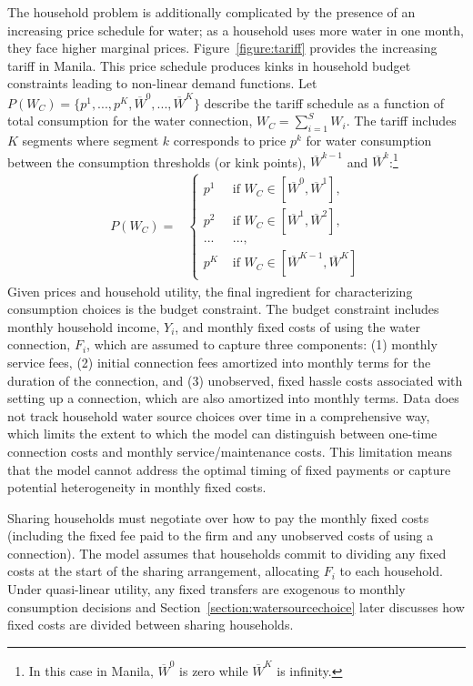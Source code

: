\documentclass[12pt]{article}
\begin{document}
The household problem is additionally complicated by the presence of an increasing price schedule for water; as a household uses more water in one month, they face higher marginal prices.  Figure~\ref{figure:tariff} provides the increasing tariff in Manila.  This price schedule produces kinks in household budget constraints leading to non-linear demand functions.  Let $P(W_C) = \{ p^{1},...,p^{K},\overline{W}^{0},...,\overline{W}^{K}\}$ describe the tariff schedule as a function of total consumption for the water connection, $W_C = \sum_{i=1}^{S} W_i$.  The tariff includes $K$ segments where segment $k$ corresponds to price $p^{k}$ for water consumption between the consumption thresholds (or kink points), $\overline{W}^{k-1}$ and $\overline{W}^{k}$:\footnote{In this case in Manila, $\overline{W}^{0}$ is zero while $\overline{W}^{K}$ is infinity.}
\begin{align*}
P(W_C)=&  
\begin{cases}
      p^{1} &\text{ if } W_C \in [\overline{W}^{0},\overline{W}^{1}], \\
      p^{2} &\text{ if } W_C \in [\overline{W}^{1},\overline{W}^{2}], \\
      ...   &\text{ ...}, \\
      p^{K} &\text{ if } W_C \in[\overline{W}^{K-1},\overline{W}^{K}]
    \end{cases}
\end{align*}
Given prices and household utility, the final ingredient for characterizing consumption choices is the budget constraint.  The budget constraint includes monthly household income, $Y_i$, and monthly fixed costs of using the water connection, $F_i$, which are assumed to capture three components: (1) monthly service fees, (2) initial connection fees amortized into monthly terms for the duration of the connection, and (3) unobserved, fixed hassle costs associated with setting up a connection, which are also amortized into monthly terms.  Data does not track household water source choices over time in a comprehensive way, which limits the extent to which the model can distinguish between one-time connection costs and monthly service/maintenance costs.  This limitation means that the model cannot address the optimal timing of fixed payments or capture potential heterogeneity in monthly fixed costs.

Sharing households must negotiate over how to pay the monthly fixed costs (including the fixed fee paid to the firm and any unobserved costs of using a connection).  The model assumes that households commit to dividing any fixed costs at the start of the sharing arrangement, allocating $F_i$ to each household.  Under quasi-linear utility, any fixed transfers are exogenous to monthly consumption decisions and Section~\ref{section:watersourcechoice} later discusses how fixed costs are divided between sharing households.
\end{document}
